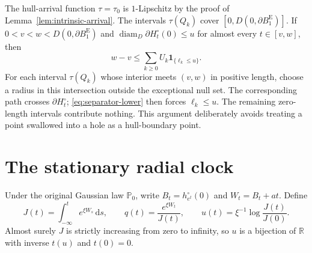 \documentclass[11pt,reqno]{amsart}
\theoremstyle{plain}
\theoremstyle{definition}
\theoremstyle{remark}
\newcommand{\R}{\mathbb R}
\newcommand{\Pp}{\mathbb P}
\newcommand{\diam}{\operatorname{diam}}
\newcommand{\1}{\mathbf{1}}
\newcommand{\dd}{\,\mathrm d}
\newcommand{\Be}{B^{\mathrm E}}
\begin{document}
The hull-arrival function $\tau=\tau_0$ is $1$-Lipschitz by the proof of Lemma~\ref{lem:intrinsic-arrival}. The intervals $\tau(Q_k)$ cover $[0,D(0,\partial\Be_1)]$. If $0<v<w<D(0,\partial\Be_1)$ and
$\diam_D\partial H_t^\circ(0)\le u$ for almost every $t\in[v,w]$, then
\begin{equation}\label{eq:thin-obstruction}
w-v\le\sum_{k\ge0}U_k\1_{\{\ell_k\le u\}}.
\end{equation}
For each interval $\tau(Q_k)$ whose interior meets $(v,w)$ in positive length, choose a radius in this intersection outside the exceptional null set. The corresponding path crosses $\partial H_t^\circ$; \eqref{eq:separator-lower} then forces $\ell_k\le u$. The remaining zero-length intervals contribute nothing. This argument deliberately avoids treating a point swallowed into a hole as a hull-boundary point.

\section{The stationary radial clock}\label{sec:clock}
Under the original Gaussian law $\Pp_0$, write $B_t=h_{e^t}^\circ(0)$ and $W_t=B_t+at$. Define
\begin{equation}\label{eq:clock}
J(t)=\int_{-\infty}^t e^{\xi W_s}\dd s,
\qquad q(t)=\frac{e^{\xi W_t}}{J(t)},
\qquad u(t)=\xi^{-1}\log\frac{J(t)}{J(0)}.
\end{equation}
Almost surely $J$ is strictly increasing from zero to infinity, so $u$ is a bijection of $\R$ with inverse $t(u)$ and $t(0)=0$.
\end{document}
